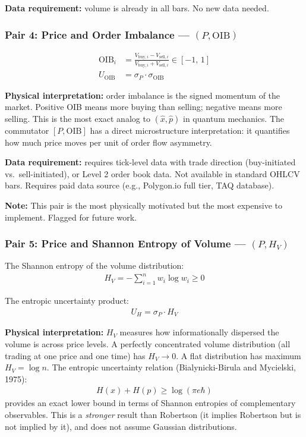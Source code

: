 \documentclass[preprint,12pt]{elsarticle}
\begin{document}
\textbf{Data requirement:} volume is already in all bars. No new data needed.

\subsubsection{Pair 4: Price and Order Imbalance --- $(P, \mathrm{OIB})$}

\begin{align}
    \mathrm{OIB}_i &= \frac{V_{\mathrm{buy},i} - V_{\mathrm{sell},i}}{V_{\mathrm{buy},i} + V_{\mathrm{sell},i}} \in [-1,\, 1] \\
    U_{\mathrm{OIB}} &= \sigma_P \cdot \sigma_{\mathrm{OIB}}
\end{align}

\textbf{Physical interpretation:} order imbalance is the signed momentum of the market. Positive OIB means more buying than selling; negative means more selling. This is the most exact analog to $(\hat{x}, \hat{p})$ in quantum mechanics. The commutator $[P, \mathrm{OIB}]$ has a direct microstructure interpretation: it quantifies how much price moves per unit of order flow asymmetry.

\textbf{Data requirement:} requires tick-level data with trade direction (buy-initiated vs.\ sell-initiated), or Level 2 order book data. Not available in standard OHLCV bars. Requires paid data source (e.g., Polygon.io full tier, TAQ database).

\textbf{Note:} This pair is the most physically motivated but the most expensive to implement. Flagged for future work.

\subsubsection{Pair 5: Price and Shannon Entropy of Volume --- $(P, H_V)$}

The Shannon entropy of the volume distribution:
\begin{align}
    H_V = -\sum_{i=1}^{n} w_i \log w_i \geq 0
\end{align}

The entropic uncertainty product:
\begin{align}
    U_H = \sigma_P \cdot H_V
\end{align}

\textbf{Physical interpretation:} $H_V$ measures how informationally dispersed the volume is across price levels. A perfectly concentrated volume distribution (all trading at one price and one time) has $H_V \to 0$. A flat distribution has maximum $H_V = \log n$. The entropic uncertainty relation (Bialynicki-Birula and Mycielski, 1975):
\begin{align}
    H(x) + H(p) \geq \log(\pi e \hbar)
\end{align}
provides an exact lower bound in terms of Shannon entropies of complementary observables. This is a \textit{stronger} result than Robertson (it implies Robertson but is not implied by it), and does not assume Gaussian distributions.
\end{document}
